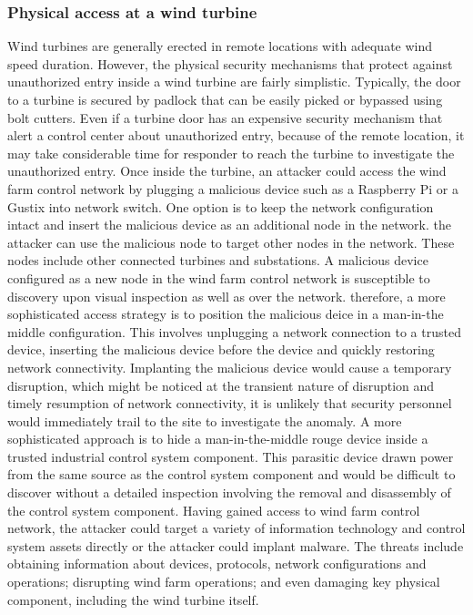 \documentclass[twosided,a4,10pt]{article}
\begin{document}
\begin{multicols}{2}
 \subsubsection{Physical access at a wind turbine}
 Wind turbines are generally erected in remote locations with adequate wind speed duration. However, the physical security mechanisms that protect against unauthorized entry inside a wind turbine are fairly simplistic. Typically, the door to a turbine is secured by padlock that can be easily picked or bypassed using bolt cutters. Even if a turbine door has an expensive security mechanism that alert a control center about unauthorized entry, because of the remote location, it may take considerable time for responder to reach the turbine to investigate the unauthorized entry.
 \newline
Once inside the turbine, an attacker could access the wind farm control network by plugging a malicious device such as a Raspberry Pi or a Gustix into network switch. One option is to keep the network configuration intact and insert the malicious device as an additional node in the network. the attacker can use the malicious node to target other nodes in the network. These nodes include other connected turbines and substations. A malicious device configured as a new node in the wind farm control network is susceptible to discovery upon visual inspection as well as over the network. therefore, a more sophisticated access strategy is to position the malicious deice in a man-in-the middle configuration. This involves unplugging a network connection to a trusted device, inserting the malicious device before the device and quickly restoring network connectivity. Implanting the malicious device would cause a temporary disruption, which might be noticed at the transient nature of disruption and timely resumption of network connectivity, it is unlikely that security personnel would immediately trail to the site to investigate the anomaly. A more sophisticated approach is to hide a man-in-the-middle rouge device inside a trusted industrial control system component. This parasitic device drawn power from the same source as the control system component and would be difficult to discover without a detailed inspection involving the removal and disassembly of the control system component. Having gained access to wind farm control network, the attacker could target a variety of information technology and control system assets directly or the attacker could implant malware. The threats include obtaining information about devices, protocols, network configurations and operations; disrupting wind farm operations; and even damaging key physical component, including the wind turbine itself.

\end{multicols}
\end{document}
